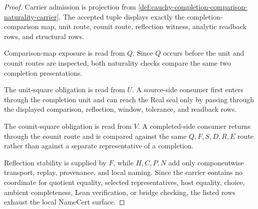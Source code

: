 \begin{proof}
Carrier admission is projection from \autoref{def:cauchy-completion-comparison-naturality-carrier}. The accepted tuple displays exactly the completion-comparison map, unit route, counit route, reflection witness, analytic readback rows, and structural rows.

Comparison-map exposure is read from $Q$. Since $Q$ occurs before the unit and counit routes are inspected, both naturality checks compare the same two completion presentations.

The unit-square obligation is read from $U$. A source-side consumer first enters through the completion unit and can reach the Real seal only by passing through the displayed comparison, reflection, window, tolerance, and readback rows.

The counit-square obligation is read from $V$. A completed-side consumer returns through the counit route and is compared against the same $Q,F,S,D,R,E$ route rather than against a separate representative of a completion.

Reflection stability is supplied by $F$, while $H,C,P,N$ add only componentwise transport, replay, provenance, and local naming. Since the carrier contains no coordinate for quotient equality, selected representatives, host equality, choice, ambient completeness, Lean verification, or bridge checking, the listed rows exhaust the local NameCert surface.
\end{proof}

